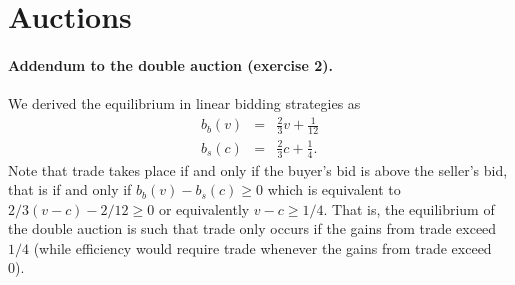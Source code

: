 \documentclass[a4paper,11pt]{article}
\begin{document}
\section{Auctions}
\label{sec:auctions}

\paragraph{Addendum to the double auction  (exercise 2).} We derived the equilibrium in linear bidding strategies as
\begin{eqnarray*}
  b_b(v)&=&\frac{2}{3}v+\frac{1}{12}\\
  b_s(c)&=&\frac{2}{3}c+\frac{1}{4}.
\end{eqnarray*}
Note that trade takes place if and only if the buyer's bid is above the seller's bid, that is if and only if $b_b(v)-b_s(c)\geq 0$ which is equivalent to $2/3 (v-c)-2/12\geq 0$ or equivalently $v-c\geq 1/4$. That is, the equilibrium of the double auction is such that trade only occurs if the gains from trade exceed $1/4$ (while efficiency would require trade whenever the gains from trade exceed 0).
\end{document}
